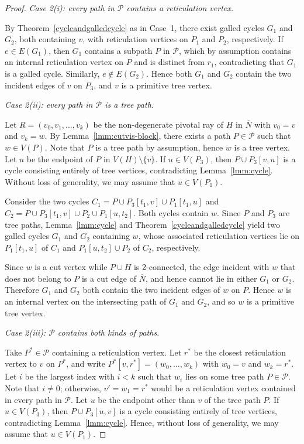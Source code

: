 \documentclass[10pt,a4paper]{amsart}
\theoremstyle{plain}
\theoremstyle{thmstyleone}
\theoremstyle{thmstyletwo}
\theoremstyle{thmstylethree}
\begin{document}
\begin{proof}
\smallskip
\noindent\emph{Case 2(i): every path in $\mathcal{P}$ contains a reticulation vertex.}

By Theorem~\ref{cycleandgalledcycle} as in Case~1, there exist galled cycles $G_1$ and $G_2$, both containing $v$, with reticulation vertices on $P_1$ and $P_2$, respectively. If $e \in E(G_1)$, then $G_1$ contains a subpath $P$ in $\mathcal{P}$, which by assumption contains an internal reticulation vertex on $P$ and is distinct from $r_1$, contradicting that $G_1$ is a galled cycle. Similarly, $e\notin E(G_2)$. Hence both $G_1$ and $G_2$ contain the two incident edges of $v$ on $P_3$, and $v$ is a primitive tree vertex.



\smallskip
\noindent\emph{Case 2(ii): every path in $\mathcal{P}$ is a tree path.}

Let $R=(v_0,v_1,\dots,v_k)$ be the non-degenerate pivotal ray of $H$ in $\overline{N}$ with $v_0=v$ and $v_k=w$. By Lemma~\ref{lmm:cutvis-block}, there exists a path $P\in\mathcal{P}$ such that $w\in V(P)$. Note that $P$ is a tree path by assumption, hence $w$ is a tree vertex.  Let $u$ be the endpoint of $P$ in $V(H)\setminus\{v\}$.  If $u\in V(P_3)$, then $P \cup P_3[v,u]$ is a cycle consisting entirely of tree vertices, contradicting Lemma~\ref{lmm:cycle}. Without loss of generality, we may assume that $u\in V(P_1)$.

Consider the two cycles
$C_1=P\cup P_3[t_1,v]\cup P_1[t_1,u]$
and
$C_2=P\cup P_3[t_1,v]\cup P_2\cup P_1[u,t_2]$.
Both cycles contain $w$. Since $P$ and $P_3$ are tree paths, Lemma~\ref{lmm:cycle} and Theorem~\ref{cycleandgalledcycle} yield two galled cycles $G_1$ and $G_2$ containing $w$, whose associated reticulation vertices lie on $P_1[t_1,u]$ of $C_1$ and $P_1[u,t_2]\cup P_2$ of $C_2$, respectively.

Since $w$ is a cut vertex while $P \cup H$ is 2-connected, the edge incident with $w$ that does not belong to $P$ is a cut edge of $\overline{N}$, and hence cannot lie in either $G_1$ or $G_2$. Therefore $G_1$ and $G_2$ both contain the two incident edges of $w$ on $P$. Hence $w$ is an internal vertex on the intersecting path of $G_1$ and $G_2$, and so $w$ is a primitive tree vertex.





\smallskip
\noindent\emph{Case 2(iii): $\mathcal{P}$ contains both kinds of paths.}

Take $P^* \in \mathcal{P}$ containing a reticulation vertex. Let $r^*$ be the closest reticulation vertex to $v$ on $P^*$, and write
$P^*[v,r^*]=(w_0,\dots,w_k)$ with $w_0=v$ and $w_k=r^*$. Let $i$ be the largest index with $i<k$ such that $w_i$ lies on some tree path $P\in\mathcal{P}$. Note that $i\ne 0$; otherwise, $v'=w_1=r^*$ would be a reticulation vertex contained in every path in $\mathcal{P}$. Let $u$ be the endpoint other than $v$  of the tree path $P$. If $u\in V(P_3)$, then $P \cup P_3[u,v]$ is a cycle consisting entirely of tree vertices, contradicting Lemma~\ref{lmm:cycle}. Hence, without loss of generality, we may assume that $u\in V(P_1)$.


\end{proof}
\end{document}
